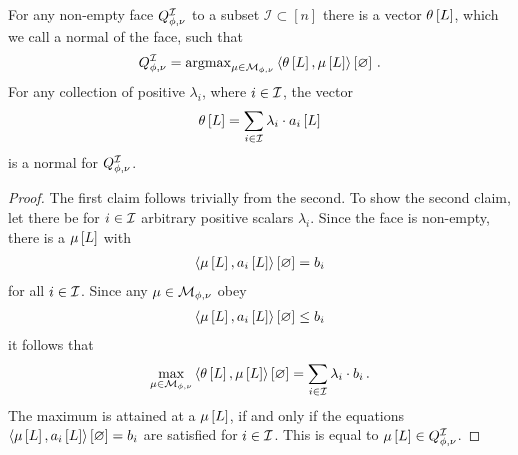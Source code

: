
\begin{theorem}
    \label{the:faceNormal}
    For any non-empty face $Q^{\mathcal{I}}_{\phi,\nu}$ to a subset $\mathcal{I}\subset[n]$ there is a vector $\theta\left[L\right]$, which we call a normal of the face, such that
    \begin{align*}
        Q^{\mathcal{I}}_{\phi,\nu} = \mathrm{argmax}_{\mu\in\mathcal{M}_{\phi,\nu}}\left\langle \theta\left[L\right],\mu\left[L\right]\right\rangle \left[ \varnothing \right]  \, .
    \end{align*}
    For any collection of positive $\lambda_i$, where $i\in\mathcal{I}$, the vector
    \begin{align*}
        \theta\left[L\right] = \sum_{i\in\mathcal{I}} \lambda_i\cdot a_{i}\left[L\right]
    \end{align*}
    is a normal for $Q^{\mathcal{I}}_{\phi,\nu}$.
\end{theorem}
\begin{proof}
    The first claim follows trivially from the second.
    To show the second claim, let there be for $i\in\mathcal{I}$ arbitrary positive scalars $\lambda_i$.
    Since the face is non-empty, there is a $\mu\left[L\right]$ with
    \begin{align*}
        \left\langle \mu\left[L\right],a_{i}\left[L\right]\right\rangle \left[ \varnothing \right]=b_{i}
    \end{align*}
    for all $i\in\mathcal{I}$.
    Since any $\mu\in\mathcal{M}_{\phi,\nu}$ obey
    \begin{align*}
        \left\langle \mu\left[L\right],a_{i}\left[L\right]\right\rangle \left[ \varnothing \right]\leq b_{i}
    \end{align*}
    it follows that
    \begin{align*}
        \max_{\mu\in\mathcal{M}_{\phi,\nu}} \left\langle \theta\left[L\right],\mu\left[L\right]\right\rangle \left[ \varnothing \right]
        = \sum_{i\in\mathcal{I}} \lambda_i \cdot b_{i} \, .
    \end{align*}
    The maximum is attained at a $\mu\left[L\right]$, if and only if the equations $\left\langle \mu\left[L\right],a_{i}\left[L\right]\right\rangle \left[ \varnothing \right]=b_{i}$ are satisfied for $i\in\mathcal{I}$.
    This is equal to $\mu\left[L\right]\in Q^{\mathcal{I}}_{\phi,\nu}$.
\end{proof}

